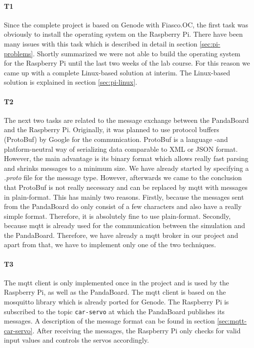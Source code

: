 \paragraph{\textbf{T1}} Since the complete project is based on Genode with Fiasco.OC, the first task was obviously to install the operating system on the Raspberry Pi. There have been many issues with this task which is described in detail in section \ref{sec:pi-problems}. Shortly summarized we were not able to build the operating system for the Raspberry Pi until the last two weeks of the lab course. For this reason we came up with a complete Linux-based solution at interim. The Linux-based solution is explained in section \ref{sec:pi-linux}.

\paragraph{\textbf{T2}} The next two tasks are related to the message exchange between the PandaBoard and the Raspberry Pi. Originally, it was planned to use protocol buffers (ProtoBuf) by Google for the communication. ProtoBuf is a language -and platform-neutral way of serializing data comparable to XML or JSON format. However, the main advantage is its binary format which allows really fast parsing and shrinks messages to a minimum size. We have already started by specifying a \textit{.proto} file for the message type. However, afterwards we came to the conclusion that ProtoBuf is not really necessary and can be replaced by mqtt with messages in plain-format. This has mainly two reasons. Firstly, because the messages sent from the PandaBoard do only consist of a few characters and also have a really simple format. Therefore, it is absolutely fine to use plain-format. Secondly, because mqtt is already used for the communication between the simulation and the PandaBoard. Therefore, we have already a mqtt broker in our project and apart from that, we have to implement only one of the two techniques.

\paragraph{\textbf{T3}} The mqtt client is only implemented once in the project and is used by the Raspberry Pi, as well as the PandaBoard. The mqtt client is based on the mosquitto library which is already ported for Genode. The Raspberry Pi is subscribed to the topic \texttt{car-servo} at which the PandaBoard publishes its messages. A description of the message format can be found in section \ref{sec:mqtt-car-servo}. After receiving the messages, the Raspberry Pi only checks for valid input values and controls the servos accordingly.

